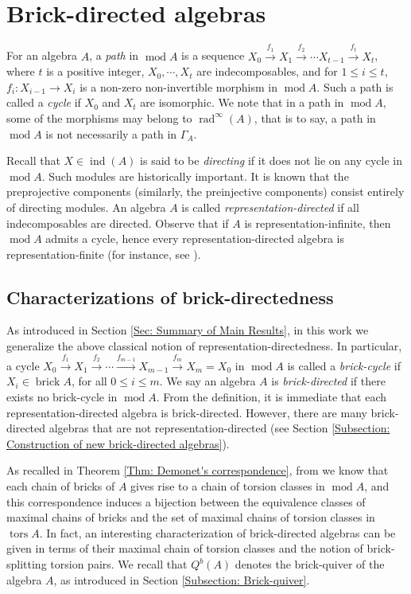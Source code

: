 \documentclass{amsart}
\theoremstyle{thmstyle}
\theoremstyle{exstyle}
\theoremstyle{defstyle}
\theoremstyle{remstyle}
\theoremstyle{remstyle}
\DeclareMathOperator*{\rad}{rad}
\DeclareMathOperator*{\modu}{mod}
\DeclareMathOperator*{\ind}{ind}
\DeclareMathOperator*{\brick}{brick}
\DeclareMathOperator*{\tors}{tors}
\begin{document}
\section{Brick-directed algebras}\label{Section: Brick-directed algebras}
For an algebra $A$, a \emph{path} in $\modu A$ is a sequence $X_0 \xrightarrow{f_1} X_1 \xrightarrow{f_2}  \cdots X_{t-1} \xrightarrow{f_t}  X_{t}$, where $t$ is a positive integer, $X_0, \cdots , X_t$ are indecomposables, and for $1\leq i \leq t$, $f_i:X_{i-1}\rightarrow X_i$ is a non-zero non-invertible morphism in $\modu A$. Such a path is called a \emph{cycle} if $X_0$ and $X_t$ are isomorphic. We note that in a path in $\modu A$, some of the morphisms may belong to $\rad^{\infty}(A)$, that is to say, a path in $\modu A$ is not necessarily a path in $\Gamma_A$. 

Recall that $X \in \ind (A)$ is said to be \emph{directing} if it does not lie on any cycle in $\modu A$. Such modules are historically important. It is known that the preprojective components (similarly, the preinjective components) consist entirely of directing modules.
An algebra $A$ is called \emph{representation-directed} if all indecomposables are directed. Observe that if $A$ is representation-infinite, then $\modu A$ admits a cycle, hence every representation-directed algebra is representation-finite (for instance, see \cite[IX. Corollary 3.4]{ASS}). 

\subsection{Characterizations of brick-directedness}\label{Characterizations of brick-directedness}
As introduced in Section \ref{Sec: Summary of Main Results}, in this work we generalize the above classical notion of representation-directedness. In particular, a cycle $X_0\xrightarrow{f_1} X_1\xrightarrow{f_2}  \cdots \xrightarrow{f_{m-1}}  X_{m-1}\xrightarrow{f_m}  X_m=X_0$ in $\modu A$ is called a \emph{brick-cycle} if $X_i \in \brick A$, for all $0\leq i\leq m$. We say an algebra $A$ is \emph{brick-directed} if there exists no brick-cycle in $\modu A$. 
From the definition, it is immediate that each representation-directed algebra is brick-directed. However, there are many brick-directed algebras that are not representation-directed (see Section \ref{Subsection: Construction of new brick-directed algebras}). 


As recalled in Theorem \ref{Thm: Demonet's correspondence}, from \cite{KD} we know that each chain of bricks of $A$ gives rise to a chain of torsion classes in $\modu A$, and this correspondence induces a bijection between the equivalence classes of maximal chains of bricks and the set of maximal chains of torsion classes in $\tors A$. In fact, an interesting characterization of brick-directed algebras can be given in terms of their maximal chain of torsion classes and the notion of brick-splitting torsion pairs. We recall that $Q^b(A)$ denotes the brick-quiver of the algebra $A$, as introduced in Section \ref{Subsection: Brick-quiver}.
\end{document}
